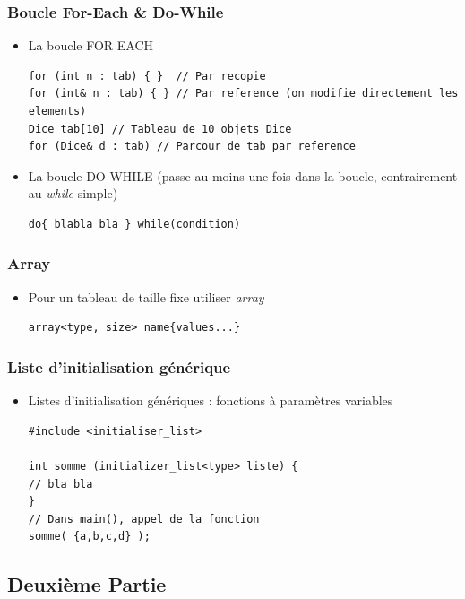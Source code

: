 \documentclass[12pt,a4paper]{article}
\begin{document}
\subsubsection{Boucle For-Each \& Do-While}
\begin{itemize}
\item La boucle FOR EACH
\begin{lstlisting}
for (int n : tab) { }  // Par recopie
for (int& n : tab) { } // Par reference (on modifie directement les elements)
Dice tab[10] // Tableau de 10 objets Dice
for (Dice& d : tab) // Parcour de tab par reference
\end{lstlisting}
\item La boucle DO-WHILE (passe au moins une fois dans la boucle, contrairement au \textit{while} simple)
\begin{lstlisting}
do{ blabla bla } while(condition)
\end{lstlisting}
\end{itemize}
\subsubsection{Array}
\begin{itemize}
\item Pour un tableau de taille fixe utiliser \textit{array}
\begin{lstlisting}
array<type, size> name{values...}
\end{lstlisting}
\end{itemize}
\subsubsection{Liste d'initialisation générique}
\begin{itemize}
\item Listes d'initialisation génériques : fonctions à paramètres variables
\begin{lstlisting}
#include <initialiser_list>

int somme (initializer_list<type> liste) {
// bla bla
}
// Dans main(), appel de la fonction
somme( {a,b,c,d} );
\end{lstlisting}
\end{itemize}

\subsection{Deuxième Partie}
\end{document}
